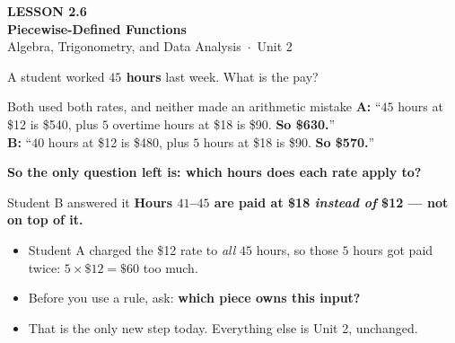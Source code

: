 \documentclass[aspectratio=169, 11pt]{beamer}
\begin{document}
{
\begin{frame}[plain]
  \vspace{2.8cm}\hspace{0.55cm}%
  \begin{minipage}{0.9\textwidth}
    {\color{goldacc}\bfseries\small LESSON 2.6}\\[0.5cm]
    {\color{white}\bfseries\LARGE Piecewise-Defined Functions}\\[1.2cm]
    {\color{mistmid}\small Algebra, Trigonometry, and Data Analysis~$\cdot$~Unit 2}
  \end{minipage}
\end{frame}
}

\begin{frame}[t, plain]
  A student worked \textbf{$45$ hours} last week. What is the pay?
  \begin{block}{Both used both rates, and neither made an arithmetic mistake}
    \small
    \textbf{A:} ``$45$ hours at \$12 is \$540, plus $5$ overtime hours at \$18 is \$90. \textbf{So
    \$630.}''\\[0.15cm]
    \textbf{B:} ``$40$ hours at \$12 is \$480, plus $5$ hours at \$18 is \$90. \textbf{So \$570.}''
  \end{block}
  \vspace{0.1cm}
  \textbf{So the only question left is: which hours does each rate apply to?}
\end{frame}

\begin{frame}[t, plain]
  \begin{block}{Student B answered it}
    \centering\large
    \textbf{Hours $41$--$45$ are paid at \$18 \emph{instead of} \$12 --- not on top of it.}
  \end{block}
  \begin{itemize}
    \setlength{\itemsep}{0.3cm}
    \item Student A charged the \$12 rate to \emph{all} $45$ hours, so those $5$ hours got paid
          twice: $5 \times \$12 = \$60$ too much.
    \item Before you use a rule, ask: \textbf{which piece owns this input?}
    \item That is the only new step today. Everything else is Unit 2, unchanged.
  \end{itemize}
\end{frame}
\end{document}

